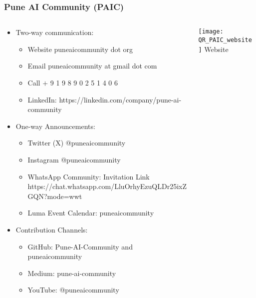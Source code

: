 \begin{frame}[fragile]\frametitle{Pune AI Community (PAIC)}

\begin{columns}
    \begin{column}[T]{0.65\linewidth}
		\begin{itemize}
		\item Two-way communication:
			\begin{itemize}
				\item Website puneaicommunity dot org
				\item Email puneaicommunity at gmail dot com
				\item Call $+$ 9 1 9 8 9 0 2 5 1 4 0 6			
				\item LinkedIn: https://linkedin.com/company/pune-ai-community
			\end{itemize}
		\item One-way Announcements:
			\begin{itemize}
				\item Twitter (X) @puneaicommunity 
				\item Instagram @puneaicommunity 
				\item WhatsApp Community: Invitation Link https://chat.whatsapp.com/LluOrhyEzuQLDr25ixZGQN?mode=wwt
				\item Luma Event Calendar: puneaicommunity
			\end{itemize}

		\item Contribution Channels:
			\begin{itemize}
				\item GitHub: Pune-AI-Community and puneaicommunity
				\item Medium: pune-ai-community 
				\item YouTube: @puneaicommunity 
			\end{itemize}
	
		\end{itemize}
    \end{column}
    \begin{column}[T]{0.35\linewidth}
		\begin{center}
		\texttt{[image: QR\_PAIC\_website]}
				{\tiny Website}	 %
								
		\end{center}	
    \end{column}
  \end{columns}
\end{frame}

